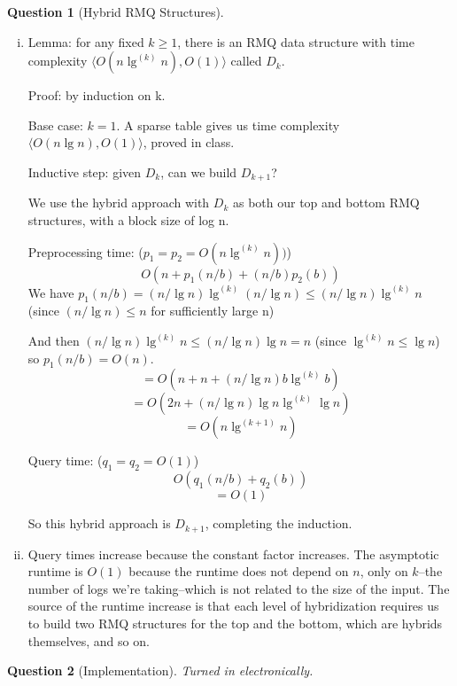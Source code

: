 \documentclass{article}
\newtheorem{ques}{Question}
\newcommand{\pq}[2]{\langle O(#1), O(#2) \rangle}
\begin{document}
\begin{ques}[Hybrid RMQ Structures]
\end{ques}
\begin{enumerate}[i.]
  \item Lemma: for any fixed $k \ge 1$, there is an RMQ data structure with time complexity $\pq{n \lg^{(k)} n}{1}$ called $D_k$.

  Proof: by induction on k.

  Base case: $k = 1$. A sparse table gives us time complexity $\pq{n \lg n}{1}$, proved in class.

  Inductive step: given $D_k$, can we build $D_{k+1}$?

  We use the hybrid approach with $D_k$ as both our top and bottom RMQ structures, with a block size of log n.

  Preprocessing time: ($p_1 = p_2 = O(n \lg^{(k)} n))$)
  $$O(n + p_1(n/b) + (n/b)p_2(b))$$
  We have $p_1(n/b) = (n/ \lg n) \lg^{(k)} (n / \lg n) \le (n/\lg n)\lg^{(k)} n$ (since $(n / \lg n) \le n$ for sufficiently large n) 

  And then $(n/\lg n)\lg^{(k)} n \le (n/\lg n)\lg n = n$ (since $\lg^{(k)} n \le \lg n$) so $p_1(n/b) = O(n)$.
  $$=O(n + n + (n / \lg n) b \lg^{(k)} b)$$
  $$=O(2n + (n / \lg n) \lg n \lg^{(k)} \lg n)$$
  $$=O(n \lg^{(k+1)} n)$$

  Query time: ($q_1 = q_2 = O(1)$)
  $$O(q_1(n/b) + q_2(b))$$
  $$=O(1)$$

  So this hybrid approach is $D_{k+1}$, completing the induction.
  \item Query times increase because the constant factor increases. The asymptotic runtime is $O(1)$ because the runtime does not depend on $n$, only on $k$--the number of logs we're taking--which is not related to the size of the input. The source of the runtime increase is that each level of hybridization requires us to build two RMQ structures for the top and the bottom, which are hybrids themselves, and so on.
\end{enumerate}

\begin{ques}[Implementation]
Turned in electronically.
\end{ques}
\end{document}

